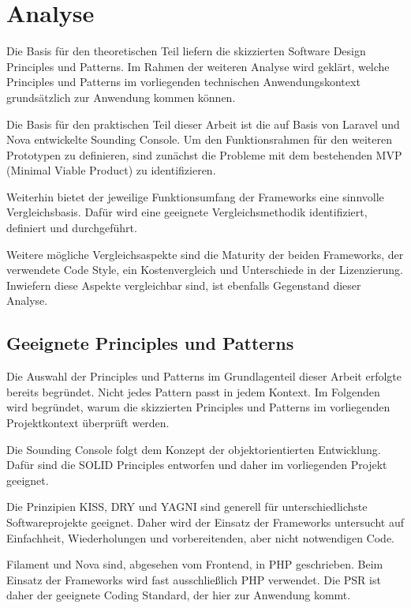 \newpage

\section{Analyse}
Die Basis für den theoretischen Teil liefern die skizzierten Software Design Principles und Patterns.
Im Rahmen der weiteren Analyse wird geklärt, welche Principles und Patterns im vorliegenden technischen Anwendungskontext grundsätzlich zur Anwendung kommen können.

Die Basis für den praktischen Teil dieser Arbeit ist die auf Basis von Laravel und Nova entwickelte Sounding Console.
Um den Funktionsrahmen für den weiteren Prototypen zu definieren, sind zunächst die Probleme mit dem bestehenden MVP (Minimal Viable Product) zu identifizieren.

Weiterhin bietet der jeweilige Funktionsumfang der Frameworks eine sinnvolle Vergleichsbasis.
Dafür wird eine geeignete Vergleichsmethodik identifiziert, definiert und durchgeführt.

Weitere mögliche Vergleichsaspekte sind die Maturity der beiden Frameworks, der verwendete Code Style, ein Kostenvergleich und Unterschiede in der Lizenzierung.
Inwiefern diese Aspekte vergleichbar sind, ist ebenfalls Gegenstand dieser Analyse.

\subsection{Geeignete Principles und Patterns}
Die Auswahl der Principles und Patterns im Grundlagenteil dieser Arbeit erfolgte bereits begründet.
Nicht jedes Pattern passt in jedem Kontext.
Im Folgenden wird begründet, warum die skizzierten Principles und Patterns im vorliegenden Projektkontext überprüft werden.

Die Sounding Console folgt dem Konzept der objektorientierten Entwicklung.
Dafür sind die SOLID Principles entworfen und daher im vorliegenden Projekt geeignet.

Die Prinzipien KISS, DRY und YAGNI sind generell für unterschiedlichste Softwareprojekte geeignet.
Daher wird der Einsatz der Frameworks untersucht auf Einfachheit, Wiederholungen und vorbereitenden, aber nicht notwendigen Code.

Filament und Nova sind, abgesehen vom Frontend, in PHP geschrieben.
Beim Einsatz der Frameworks wird fast ausschließlich PHP verwendet.
Die PSR ist daher der geeignete Coding Standard, der hier zur Anwendung kommt.

